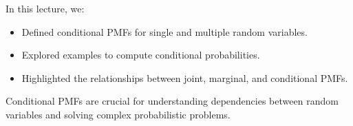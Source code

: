 \documentclass{article}
\begin{document}
In this lecture, we:
\begin{itemize}
  \item Defined conditional PMFs for single and multiple random variables.
  \item Explored examples to compute conditional probabilities.
  \item Highlighted the relationships between joint, marginal, and conditional PMFs.
\end{itemize}

Conditional PMFs are crucial for understanding dependencies between random variables and solving complex probabilistic problems.
\end{document}
